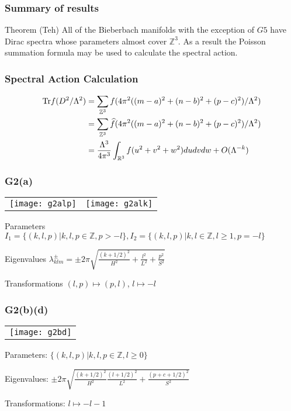 \documentclass{beamer}
\def\Z{{\mathbb Z}}
\def\R{{\mathbb R}}
\def\Tr{{\rm Tr}}
\begin{document}
\begin{frame}
  \frametitle{Summary of results}
  \begin{block}{Theorem (Teh)} All of the Bieberbach manifolds with the exception of $G5$ have Dirac spectra whose parameters almost cover $\Z ^3$. As a result the Poisson summation formula may be used to calculate the spectral action.
  \end{block}
\end{frame}

\begin{frame}
  \frametitle{Spectral Action Calculation}
  \begin{block}{}
    \begin{align*}
      \Tr f(D^2/\Lambda ^2) &= \sum_{\Z ^3} f(4 \pi ^2 ((m-a)^2 + (n-b)^2 + (p-c)^2)/\Lambda ^2) \\
      &= \sum_{\Z^3} \widehat{f}(4 \pi ^2 ((m-a)^2 + (n-b)^2 + (p-c)^2)/\Lambda ^2) \\
      &= \frac{\Lambda^3}{4\pi ^3} \int_{\R ^3}f(u^2 + v^2 + w^2)dudvdw + O(\Lambda^{-k})
    \end{align*}
  \end{block}
\end{frame}

\begin{frame}
  \frametitle{G2(a)}
    \begin{tabular}[]{lr}
\texttt{[image: g2alp]} & \texttt{[image: g2alk]}\\
    \end{tabular}

    \begin{block}{Parameters}
    {\small
      $I_1 = \{(k,l,p)| k,l,p \in \Z, p > -l \}, I_2 = \{(k,l,p)| k,l \in \Z, l \geq 1, p = -l \}$
      }
    \end{block}
    \begin{block}{Eigenvalues}
      $\lambda_{klm}^{\pm} = \pm 2 \pi \sqrt{\frac{(k + 1/2)^2}{H^2} + \frac{l^2}{L^2} + \frac{p^2}{S^2}}$
    \end{block}
    \begin{block}{Transformations}
    $(l,p) \mapsto (p,l)$, $l \mapsto -l$
    \end{block}
\end{frame}

\begin{frame}
  \frametitle{G2(b)(d)}
    \begin{tabular}[]{l}
\texttt{[image: g2bd]}\\
    \end{tabular}
    \begin{block}{}
      Parameters: $\{(k,l,p)| k,l,p \in \Z, l \geq 0\}$

      Eigenvalues: $\pm 2\pi\sqrt{\frac{(k+1/2)^2}{H^2}\frac{(l+1/2)^2}{L^2} + \frac{(p+c+1/2)^2}{S^2}}$
      
      Transformations: $l \mapsto -l - 1$
    \end{block}

\end{frame}
\end{document}
